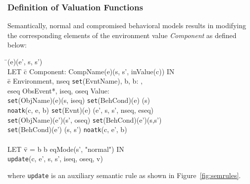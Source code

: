 \documentclass[conference]{IEEEtran}
\begin{document}
\subsubsection{Definition of Valuation Functions}
Semantically, normal and compromised behavioral models results in modifying the corresponding elements of the environment value \emph{Component} as defined below:
\begin{tabbing}
\textlbrackdbl\=\textrbrackdbl (e)(e', s, s')  
\\\> LET \= c  Component: \textlbrackdbl CompName\textrbrackdbl(e)(s, s', inValue(c)) IN
\\\>  \=e  Environment, nseq  \texttt{set}(EvntName), b, b: ,
\\\>\> eseq  ObsEvent*, iseq, oseq  Value: \\\>\> \textlbrackdbl \texttt{set}(ObjName)\textrbrackdbl (e)(s, iseq)  \textlbrackdbl \texttt{set}(BehCond)\textrbrackdbl (e) (s) 
\\\>\> {\tt noatk}(c, e, b)  \textlbrackdbl \texttt{set}(Evnt)\textrbrackdbl (e) (e', s, s', nseq, eseq) 
\\\>\> \textlbrackdbl \texttt{set}(ObjName)\textrbrackdbl (e')(s', oseq) \textlbrackdbl \texttt{set}(BehCond)\textrbrackdbl(e')(s,s') 
\\\>\> \textlbrackdbl \texttt{set}(BehCond)\textrbrackdbl (e') (s, s')  {\tt noatk}(c, e', b)
\\\>\>
\\\>\> LET \=v = b  b  eqMode(s', "normal") IN
\\\>\>\> {\tt update}(c, e', s, s', iseq, oseq, v)
\end{tabbing}
where {\tt update} is an auxiliary semantic rule as shown in Figure~\ref{fig:semrules}.
\end{document}
